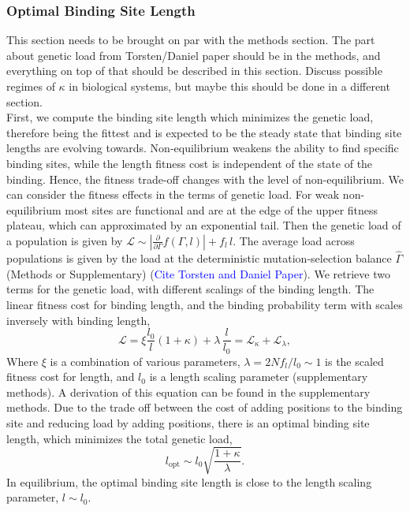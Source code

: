 \documentclass[10pt,a4paper]{article}
\begin{document}
	\subsubsection*{Optimal Binding Site Length}
	{\color{ForestGreen} This section needs to be brought on par with the methods section. The part about genetic load from Torsten/Daniel paper should be in the methods, and everything on top of that should be described in this section. Discuss possible regimes of $\kappa$ in biological systems, but maybe this should be done in a different section.}\\
	First, we compute the binding site length which minimizes the genetic load, therefore being the fittest and is expected to be the steady state that binding site lengths are evolving towards.
	Non-equilibrium weakens the ability to find specific binding sites, while the length fitness cost is independent of the state of the binding. Hence, the fitness trade-off changes with the level of non-equilibrium. We can consider the fitness effects in the terms of genetic load. For weak non-equilibrium most sites are functional and are at the edge of the upper fitness plateau, which can approximated by an exponential tail. Then the genetic load of a population is given by $\mathcal{L}\sim \left|\frac{\partial}{\partial \Gamma} f(\Gamma,l)\right|+f_l\,l$. The average load across populations is given by the load at the deterministic mutation-selection balance $\hat{\Gamma}$(Methods or Supplementary) (\textcolor{blue}{Cite Torsten and Daniel Paper}). We retrieve two terms for the genetic load, with different scalings of the binding length. The linear fitness cost for binding length, and the binding probability term with scales inversely with binding length,
	\begin{equation}
		\mathcal{L} = \xi \frac{l_0}{l}(1+\kappa)+\lambda \, \frac{l}{l_0} = \mathcal{L}_\kappa + \mathcal{L}_\lambda,
		\label{equ:maintext_load}
	\end{equation}
	Where $\xi$ is a combination of various parameters, $\lambda=2Nf_l/l_0\sim 1$ is the scaled fitness cost for length,  and $l_0$ is a length scaling parameter (supplementary methods). A derivation of this equation can be found in the supplementary methods. Due to the trade off between the cost of adding positions to the binding site and reducing load by adding positions, there is an optimal binding site length, which minimizes the total genetic load,
	\begin{equation}
		l_\text{opt}\sim l_0\sqrt{\frac{1+\kappa}{\lambda}}.
	\end{equation}
	In equilibrium, the optimal binding site length is close to the length scaling parameter, $l\sim l_0$.  
\end{document}
